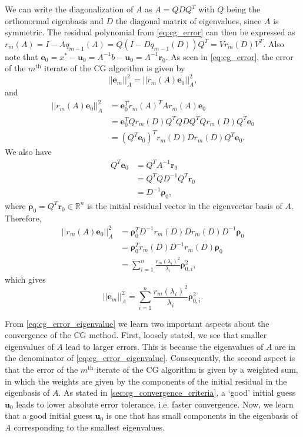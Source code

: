 We can write the diagonalization of $A$ as $A = QDQ^T$ with $Q$ being the orthonormal eigenbasis and $D$ the diagonal matrix of eigenvalues, since $A$ is symmetric. The residual polynomial from \cref{eq:cg_error} can then be expressed as $r_m(A) = I - Aq_{m-1}(A) = Q(I - Dq_{m-1}(D))Q^T = Vr_m(D)V^T$. Also note that $\mathbf{e}_0 = x^* - \mathbf{u}_0 = A^{-1}b - \mathbf{u}_0 = A^{-1}\mathbf{r}_0$. As seen in \cref{eq:cg_error}, the error of the $m^{\text{th}}$ iterate of the CG algorithm is given by
\begin{equation*}
  ||\mathbf{e}_m||_A^2 = ||r_m(A)\mathbf{e}_0||_A^2,
\end{equation*}
and
\begin{align*}
  ||r_m(A)\mathbf{e}_0||_A^2 & = \mathbf{e}_0^T r_m(A)^T A r_m(A) \mathbf{e}_0                 \\
                             & = \mathbf{e}_0^T Q r_m(D) Q^T Q D Q^T Q r_m(D) Q^T \mathbf{e}_0 \\
                             & = (Q^T\mathbf{e}_0)^T r_m(D) D r_m(D) Q^T \mathbf{e}_0.
\end{align*}
We also have
\begin{align*}
  Q^T\mathbf{e}_0 & = Q^T A^{-1} \mathbf{r}_0       \\
                  & = Q^T Q D^{-1} Q^T \mathbf{r}_0 \\
                  & = D^{-1} \mathbf{\rho}_0,
\end{align*}
where $\mathbf{\rho}_0 = Q^T \mathbf{r}_0 \in \mathbb{R}^n$ is the initial residual vector in the eigenvector basis of $A$. Therefore,
\begin{align*}
  ||r_m(A)\mathbf{e}_0||_A^2 & = \mathbf{\rho}_0^T D^{-1} r_m(D) D r_m(D) D^{-1} \mathbf{\rho}_0        \\
                             & = \mathbf{\rho}_0^T r_m(D) D^{-1} r_m(D)  \mathbf{\rho}_0                \\
                             & = \sum_{i=1}^n \frac{r_m(\lambda_i)^2}{\lambda_i} \mathbf{\rho}_{0,i}^2,
\end{align*}
which gives
\begin{equation}
  ||\mathbf{e}_m||_A^2 = \sum_{i=1}^n \frac{r_m(\lambda_i)^2}{\lambda_i} \mathbf{\rho}_{0,i}^2.
  \label{eq:cg_error_eigenvalue}
\end{equation}

From \cref{eq:cg_error_eigenvalue} we learn two important aspects about the convergence of the CG method. First, loosely stated, we see that smaller eigenvalues of $A$ lead to larger errors. This is because the eigenvalues of $A$ are in the denominator of \cref{eq:cg_error_eigenvalue}. Consequently, the second aspect is that the error of the $m^{\text{th}}$ iterate of the CG algorithm is given by a weighted sum, in which the weights are given by the components of the initial residual in the eigenbasis of $A$. As stated in \cref{sec:cg_convergence_criteria}, a `good' initial guess $\mathbf{u}_0$ leads to lower absolute error tolerance, i.e. faster convergence. Now, we learn that a good initial guess $\mathbf{u}_0$ is one that has small components in the eigenbasis of $A$ corresponding to the smallest eigenvalues.

